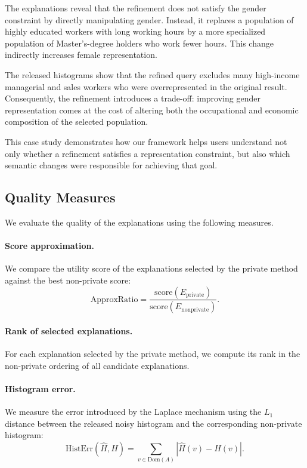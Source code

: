 The explanations reveal that the refinement does not satisfy the gender
constraint by directly manipulating gender. Instead, it replaces a
population of highly educated workers with long working hours by a more
specialized population of Master's-degree holders who work fewer hours.
This change indirectly increases female representation.

The released histograms show that the refined query excludes many
high-income managerial and sales workers who were overrepresented in the
original result. Consequently, the refinement introduces a trade-off:
improving gender representation comes at the cost of altering both the
occupational and economic composition of the selected population.

This case study demonstrates how our framework helps users understand
not only whether a refinement satisfies a representation constraint, but
also which semantic changes were responsible for achieving that goal.

\subsection{Quality Measures}
\label{subsec:quality-measures}

We evaluate the quality of the explanations using the following measures.

\paragraph{Score approximation.}
We compare the utility score of the explanations selected by the private method
against the best non-private score:
\[
    \mathrm{ApproxRatio}
    =
    \frac{\mathrm{score}(E_{\mathrm{private}})}
         {\mathrm{score}(E_{\mathrm{nonprivate}})}.
\]

\paragraph{Rank of selected explanations.}
For each explanation selected by the private method, we compute its rank in the
non-private ordering of all candidate explanations.

\paragraph{Histogram error.}
We measure the error introduced by the Laplace mechanism using the $L_1$ distance
between the released noisy histogram and the corresponding non-private histogram:
\[
    \mathrm{HistErr}(\widehat{H}, H)
    =
    \sum_{v \in \mathrm{Dom}(A)} |\widehat{H}(v) - H(v)|.
\]

